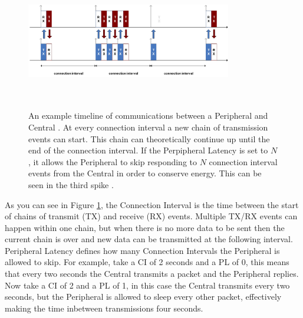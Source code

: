 \begin{figure}[]
    \centering
    \includegraphics[width=0.8\textwidth,height=6cm,keepaspectratio=true]{images/connection_interval_slave_latency}
    \caption{
        An example timeline of communications between a \color{red} Peripheral \color{black} and \color{blue} Central \color{black}. At every connection interval a new chain of transmission events can start. This chain can theoretically continue up until the end of the connection interval. If the Perpipheral Latency is set to $N$, it allows the Peripheral to skip responding to $N$ connection interval events from the Central in order to conserve energy. This can be seen in the third spike \cite{nordic_2022}.
    }
    \label{fig:ci_and_pl}
\end{figure}

As you can see in Figure \ref{fig:ci_and_pl}, the Connection Interval is the time between the start of chains of transmit (TX) and receive (RX) events. Multiple TX/RX events can happen within one chain, but when there is no more data to be sent then the current chain is over and new data can be transmitted at the following interval. Peripheral Latency defines how many Connection Intervals the Peripheral is allowed to skip. For example, take a CI of 2 seconds and a PL of 0, this means that every two seconds the Central transmits a packet and the Peripheral replies. Now take a CI of 2 and a PL of 1, in this case the Central transmits every two seconds, but the Peripheral is allowed to sleep every other packet, effectively making the time inbetween transmissions four seconds. 


